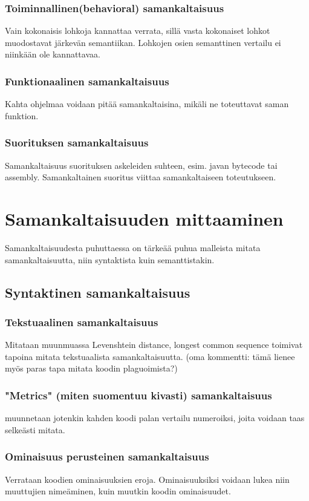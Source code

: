 \documentclass[finnish]{tktltiki2}
\theoremstyle{definition}
\theoremstyle{remark}
\begin{document}
\subsubsection{Toiminnallinen(behavioral) samankaltaisuus}
Vain kokonaisis lohkoja kannattaa verrata, sillä vasta kokonaiset lohkot muodostavat järkevän semantiikan. Lohkojen osien semanttinen vertailu ei niinkään ole kannattavaa.
\subsubsection{Funktionaalinen samankaltaisuus}
Kahta ohjelmaa voidaan pitää samankaltaisina, mikäli ne toteuttavat saman funktion.
\subsubsection{Suorituksen samankaltaisuus}
Samankaltaisuus suorituksen askeleiden suhteen, esim. javan bytecode tai assembly. Samankaltainen suoritus viittaa samankaltaiseen toteutukseen.

\section{Samankaltaisuuden mittaaminen}
Samankaltaisuudesta puhuttaessa on tärkeää puhua malleista mitata samankaltaisuutta, niin syntaktista kuin semanttistakin.
\subsection{Syntaktinen samankaltaisuus}
\subsubsection{Tekstuaalinen samankaltaisuus}
Mitataan muunmuassa Levenshtein distance, longest common sequence toimivat tapoina mitata tekstuaalista samankaltaisuutta. (oma kommentti: tämä lienee myös paras tapa mitata koodin plaguoimista?)
\subsubsection{"Metrics" (miten suomentuu kivasti) samankaltaisuus}
muunnetaan jotenkin kahden koodi palan vertailu numeroiksi, joita voidaan taas selkeästi mitata.
\subsubsection{Ominaisuus perusteinen samankaltaisuus}
Verrataan koodien ominaisuuksien eroja. Ominaisuuksiksi voidaan lukea niin muuttujien nimeäminen, kuin muutkin koodin ominaisuudet.
\end{document}
